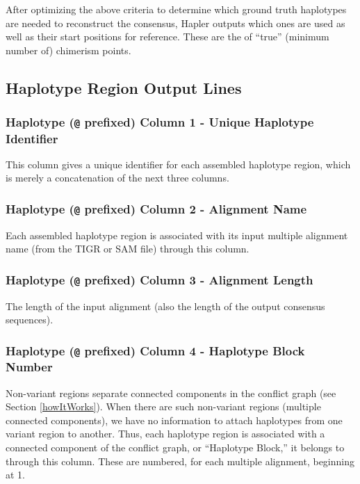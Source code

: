 \documentclass[11pt]{llncs}
\begin{document}
After optimizing the above criteria to determine which ground truth haplotypes are needed to reconstruct the consensus, Hapler outputs which ones
are used as well as their start positions for reference. These are the of ``true'' (minimum number of) chimerism points.

\newpage
\subsection{Haplotype Region Output Lines}

\subsubsection{Haplotype (\texttt{@} prefixed) Column 1 - Unique Haplotype Identifier}

This column gives a unique identifier for each assembled haplotype region, which is merely a concatenation of the next three columns.

\subsubsection{Haplotype (\texttt{@} prefixed) Column 2 - Alignment Name}

Each assembled haplotype region is associated with its input multiple alignment name (from the TIGR or SAM file) through this column.

\subsubsection{Haplotype (\texttt{@} prefixed) Column 3 - Alignment Length}

The length of the input alignment (also the length of the output consensus sequences).


\subsubsection{Haplotype (\texttt{@} prefixed) Column 4 - Haplotype Block Number}

Non-variant regions separate connected components in the conflict graph (see Section \ref{howItWorks}). When there are such non-variant regions 
(multiple connected components), we have no information to attach haplotypes from one variant region to another. Thus, each haplotype region is 
associated with a connected component of the conflict graph, or ``Haplotype Block,'' it belongs to through this column. These are numbered, for each 
multiple alignment, beginning at 1.
\end{document}
